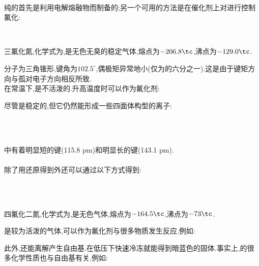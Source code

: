 \documentclass{ctexart}
\begin{document}
\paragraph{}
纯的首先是利用电解熔融物而制备的;另一个可用的方法是在催化剂上对进行控制氟化:
\begin{center}
    \\
\end{center}
\begin{substance}[\ce{NF3}]
    三氟化氮,化学式为,是无色无臭的稳定气体,熔点为$-206.8\tc$,沸点为$-129.0\tc$.
\end{substance}
\indent{}分子为三角锥形,键角为$102.5^\circ$,偶极矩异常地小(仅为的六分之一).这是由于键矩方向与孤对电子方向相反所致.\\
\indent 在常温下,是不活泼的.升高温度时可以作为氟化剂:
\begin{center}
\end{center}
尽管是稳定的,但它仍然能形成一些四面体构型的离子:
\begin{center}
    \\
    \\
\end{center}
中有着明显短的键(115.8 pm)和明显长的键(143.1 pm).
\paragraph{}
除了用还原得到外还可以通过以下方式得到:
\begin{center}
    \\
    \\
\end{center}
\begin{substance}[\ce{N2F4}]
    四氟化二氮,化学式为,是无色气体,熔点为$-164.5\tc$,沸点为$-73\tc$.
\end{substance}
\indent{}是较为活泼的气体,可以作为氟化剂与很多物质发生反应,例如:
\begin{center}
\end{center}
此外,还能离解产生自由基.在低压下快速冷冻就能得到暗蓝色的固体.事实上,的很多化学性质也与自由基有关,例如:
\begin{center}
    \\
\end{center}
\end{document}
